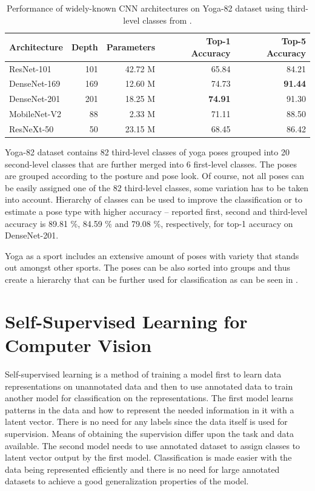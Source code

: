 \begin{table}[ht]
    \centering
    \begin{tabular}{l r r r r}
        \hline
        Architecture & Depth & Parameters & Top-1 Accuracy & Top-5 Accuracy \\
        \hline
        ResNet-101 & 101 & 42.72 M & 65.84 & 84.21 \\
        DenseNet-169 & 169 & 12.60 M & 74.73 & \textbf{91.44} \\
        DenseNet-201 & 201 & 18.25 M & \textbf{74.91} & 91.30 \\
        MobileNet-V2 & 88 & 2.33 M & 71.11 & 88.50 \\
        ResNeXt-50 & 50 & 23.15 M & 68.45 & 86.42 \\
        \hline
    \end{tabular}
    \caption{Performance of widely-known CNN architectures on Yoga-82 dataset using third-level classes from \cite{verma2020yoga}.}
    \label{tab:yoga82-results}
\end{table}

Yoga-82 dataset contains 82 third-level classes of yoga poses grouped into 20 second-level classes that are further merged into 6 first-level classes. The poses are grouped according to the posture and pose look. Of course, not all poses can be easily assigned one of the 82 third-level classes, some variation has to be taken into account. Hierarchy of classes can be used to improve the classification or to estimate a pose type with higher accuracy -- reported first, second and third-level accuracy is 89.81 \%, 84.59 \% and 79.08 \%, respectively, for top-1 accuracy on DenseNet-201.

Yoga as a sport includes an extensive amount of poses with variety that stands out amongst other sports. The poses can be also sorted into groups and thus create a hierarchy that can be further used for classification as can be seen in \cite{verma2020yoga}.

\section{\label{sec:self-supervised}Self-Supervised Learning for Computer Vision}

Self-supervised learning is a method of training a model first to learn data representations on unannotated data and then to use annotated data to train another model for classification on the representations. The first model learns patterns in the data and how to represent the needed information in it with a latent vector. There is no need for any labels since the data itself is used for supervision. Means of obtaining the supervision differ upon the task and data available. The second model needs to use annotated dataset to assign classes to latent vector output by the first model. Classification is made easier with the data being represented efficiently and there is no need for large annotated datasets to achieve a good generalization properties of the model.

